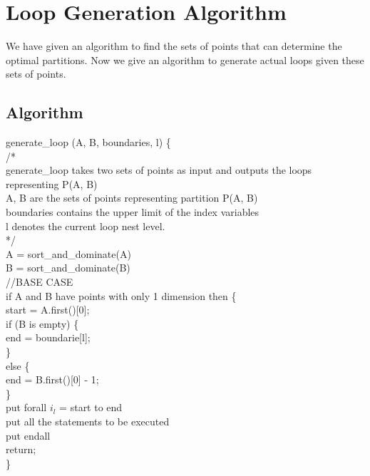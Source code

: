 \chapter{Loop Generation Algorithm}
We have given an algorithm to find the sets of points that can determine the optimal partitions. Now we give an algorithm to generate actual loops given these sets of points. \\

\section{Algorithm}


generate\_loop (A, B, boundaries, l) \{ \\

/* \\
generate\_loop takes two sets of points as input and outputs the loops representing P(A, B) \\

A, B are the sets of points representing partition P(A, B) \\
boundaries contains the upper limit of the index variables \\
l denotes the current loop nest level. \\
*/ \\

\indent	A = sort\_and\_dominate(A) \\
\indent	B = sort\_and\_dominate(B) \\

\indent	//BASE CASE \\
\indent	if A and B have points with only 1 dimension then \{ \\
\indent \indent		start = A.first()[0]; \\
\indent		if (B is empty) \{ \\
\indent\indent			end = boundarie[l]; \\
\indent		\} \\
\indent		else \{ \\
\indent\indent			end = B.first()[0] - 1; \\
\indent		\} \\
\indent		put forall $i_l$ = start to end \\
\indent		put all the statements to be executed \\
\indent		put endall \\

\indent		return; \\
\indent	\} \\
	
